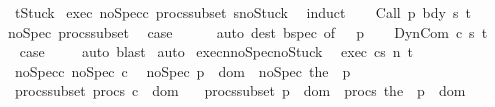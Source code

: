 \begin{isabellebody}
\ \ {\isachardoublequoteopen}t{\isasymnoteq}Stuck{\isachardoublequoteclose}\isanewline
%
\isadelimproof
%
\endisadelimproof
%
\isatagproof
{}\isamarkupfalse%
\ exec\ noSpec{\isacharunderscore}c\ procs{\isacharunderscore}subset\ s{\isacharunderscore}no{\isacharunderscore}Stuck\ \isamarkupfalse%
\ induct\isanewline
\ \ \isamarkupfalse%
\ {\isacharparenleft}Call\ p\ bdy\ s\ t{\isacharparenright}\ \isamarkupfalse%
\ noSpec{\isacharunderscore}{\isasymGamma}\ procs{\isacharunderscore}subset{\isacharunderscore}{\isasymGamma}\ \isamarkupfalse%
\ {\isacharquery}case\isanewline
\ \ \ \ \isamarkupfalse%
\ {\isacharparenleft}auto\ dest{\isacharbang}{\isacharcolon}\ bspec\ {\isacharbrackleft}of\ {\isacharunderscore}\ {\isacharunderscore}\ p{\isacharbrackright}{\isacharparenright}\isanewline
{}\isamarkupfalse%
\isanewline
\ \ \isamarkupfalse%
\ {\isacharparenleft}DynCom\ c\ s\ t{\isacharparenright}\ \isamarkupfalse%
\ \isamarkupfalse%
\ {\isacharquery}case\isanewline
\ \ \ \isamarkupfalse%
\ auto\ blast\isanewline
{}\isamarkupfalse%
\ auto%
\endisatagproof
{\isafoldproof}%
%
\isadelimproof
\isanewline
%
\endisadelimproof
\isanewline
{}\isamarkupfalse%
\ execn{\isacharunderscore}noSpec{\isacharunderscore}no{\isacharunderscore}Stuck{\isacharcolon}\isanewline
\ \ exec{\isacharcolon}\ {\isachardoublequoteopen}{\isasymGamma}{\isasymturnstile}{\isasymlangle}c{\isacharcomma}s{\isasymrangle}\ {\isacharequal}n{\isasymRightarrow}\ t{\isachardoublequoteclose}\isanewline
\ \ noSpec{\isacharunderscore}c{\isacharcolon}\ {\isachardoublequoteopen}noSpec\ c{\isachardoublequoteclose}\isanewline
\ \ noSpec{\isacharunderscore}{\isasymGamma}{\isacharcolon}\ {\isachardoublequoteopen}{\isasymforall}p\ {\isasymin}\ dom\ {\isasymGamma}{\isachardot}\ noSpec\ {\isacharparenleft}the\ {\isacharparenleft}{\isasymGamma}\ p{\isacharparenright}{\isacharparenright}{\isachardoublequoteclose}\isanewline
\ \ procs{\isacharunderscore}subset{\isacharcolon}\ {\isachardoublequoteopen}procs\ c\ {\isasymsubseteq}\ dom\ {\isasymGamma}{\isachardoublequoteclose}\isanewline
\ \ procs{\isacharunderscore}subset{\isacharunderscore}{\isasymGamma}{\isacharcolon}\ {\isachardoublequoteopen}{\isasymforall}p\ {\isasymin}\ dom\ {\isasymGamma}{\isachardot}\ procs\ {\isacharparenleft}the\ {\isacharparenleft}{\isasymGamma}\ p{\isacharparenright}{\isacharparenright}\ {\isasymsubseteq}\ dom\ {\isasymGamma}{\isachardoublequoteclose}\isanewline

\end{isabellebody}
